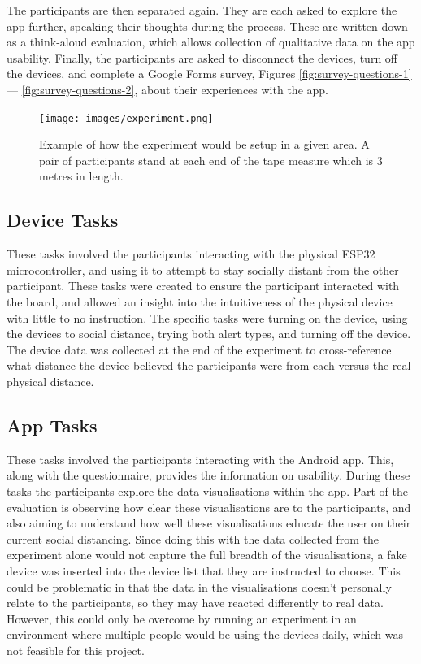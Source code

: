 \documentclass{l4proj}
\begin{document}
The participants are then separated again. They are each asked to explore the app further, speaking their thoughts during the process. These are written down as a think-aloud evaluation, which allows collection of qualitative data on the app usability. Finally, the participants are asked to disconnect the devices, turn off the devices, and complete a Google Forms survey, Figures \ref{fig:survey-questions-1} — \ref{fig:survey-questions-2}, about their experiences with the app.

\begin{figure}[!htb]
    \centering
    \texttt{[image: images/experiment.png]}

    \caption{ Example of how the experiment would be setup in a given area. A pair of participants stand at each end of the tape measure which is 3 metres in length. }

    \label{fig:experiment_setup}
\end{figure}

\subsection{Device Tasks}

These tasks involved the participants interacting with the physical ESP32 microcontroller, and using it to attempt to stay socially distant from the other participant. These tasks were created to ensure the participant interacted with the board, and allowed an insight into the intuitiveness of the physical device with little to no instruction. The specific tasks were turning on the device, using the devices to social distance, trying both alert types, and turning off the device. The device data was collected at the end of the experiment to cross-reference what distance the device believed the participants were from each versus the real physical distance.

\subsection{App Tasks}

These tasks involved the participants interacting with the Android app. This, along with the questionnaire, provides the information on usability. During these tasks the participants explore the data visualisations within the app. Part of the evaluation is observing how clear these visualisations are to the participants, and also aiming to understand how well these visualisations educate the user on their current social distancing. Since doing this with the data collected from the experiment alone would not capture the full breadth of the visualisations, a fake device was inserted into the device list that they are instructed to choose. This could be problematic in that the data in the visualisations doesn't personally relate to the participants, so they may have reacted differently to real data. However, this could only be overcome by running an experiment in an environment where multiple people would be using the devices daily, which was not feasible for this project.
\end{document}
